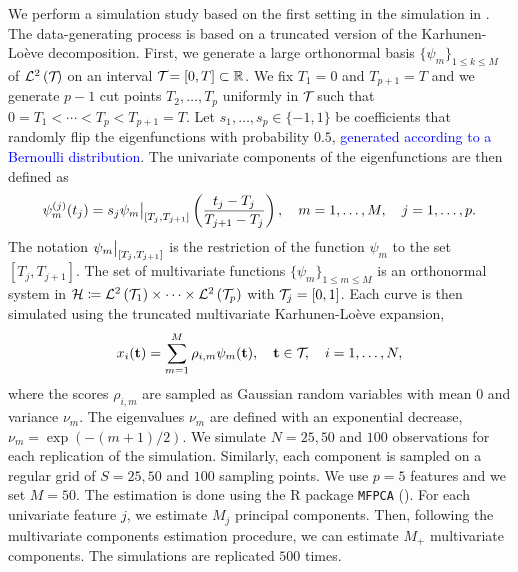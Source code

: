 We perform a simulation study based on the first setting in the simulation in \cite{happMultivariateFunctionalPrincipal2018}. The data-generating process is based on a truncated version of the Karhunen-Loève decomposition. First, we generate a large orthonormal basis $\{\psi_m\}_{1 \leq k \leq M}$ of $\mathcal{L}^{2}\left(\mathcal{T}_{}\right)$ on an interval $\mathcal{T}_{} = [0, T] \subset \mathbb{R}$. We fix $T_1 = 0$ and $T_{p + 1} = T$ and we generate $p - 1$ cut points $T_2, \dots, T_p$ uniformly in $\mathcal{T}_{}$ such that $0 = T_1 < \cdots < T_p < T_{p+1} = T$. Let $s_1, \dots, s_p \in \{-1, 1\}$ be coefficients that randomly flip the eigenfunctions with probability $0.5$, \textcolor{blue}{generated according to a Bernoulli distribution}. The univariate components of the eigenfunctions are then defined as
\begin{equation}\label{eq:simulation_uni_component}
    \psi_m^{(j)}(t_j) = s_j \restr{\psi_m}{[T_j, T_{j + 1}]}\left(\frac{t_j - T_j}{T_{j + 1} - T_j}\right), \quad m = 1, \dots, M, \quad j = 1, \dots, p.
\end{equation}
The notation $\restr{\psi_m}{[T_j, T_{j + 1}]}$ is the restriction of the function $\psi_m$ to the set $[T_j, T_{j + 1}]$. The set of multivariate functions $\{\psi_m\}_{1 \leq m \leq M}$ is an orthonormal system in $\mathcal{H} \coloneqq \mathcal{L}^{2}\left(\mathcal{T}_{1}\right) \times \dots \times \mathcal{L}^{2}\left(\mathcal{T}_{p}\right)$ with $\mathcal{T}_{j} = [0, 1]$. Each curve is then simulated using the truncated multivariate Karhunen-Loève expansion,
\begin{equation}
    x_i(\mathbf{t}) = \sum_{m = 1}^M \rho_{i, m} \psi_m(\mathbf{t}), \quad \mathbf{t} \in \mathcal{T}_{},\quad i = 1, \dots, N,
\end{equation}
where the scores $\rho_{i, m}$ are sampled as Gaussian random variables with mean $0$ and variance $\nu_m$. The eigenvalues $\nu_m$ are defined with an exponential decrease, $\nu_m = \exp(-(m + 1)/2)$. We simulate $N = 25, 50$ and $100$ observations for each replication of the simulation. Similarly, each component is sampled on a regular grid of $S = 25, 50$ and $100$ sampling points. We use $p = 5$ features and we set $M = 50$. The estimation is done using the \textsf{R} package \texttt{MFPCA} (\cite{happ-kurzObjectOrientedSoftwareFunctional2020}). For each univariate feature $j$, we estimate $M_j$ principal components. Then, following the multivariate components estimation procedure, we can estimate $M_+$ multivariate components. The simulations are replicated $500$ times.

